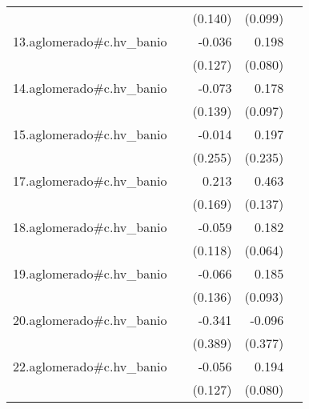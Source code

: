 {\begin{longtable}{l*{4}{D{.}{.}{-1}}}
            &                     &     (0.140)         &     (0.099)         &                     \\
\addlinespace
13.aglomerado#c.hv\_banio&                     &      -0.036         &       0.198\sym{*}  &                     \\
            &                     &     (0.127)         &     (0.080)         &                     \\
\addlinespace
14.aglomerado#c.hv\_banio&                     &      -0.073         &       0.178         &                     \\
            &                     &     (0.139)         &     (0.097)         &                     \\
\addlinespace
15.aglomerado#c.hv\_banio&                     &      -0.014         &       0.197         &                     \\
            &                     &     (0.255)         &     (0.235)         &                     \\
\addlinespace
17.aglomerado#c.hv\_banio&                     &       0.213         &       0.463\sym{***}&                     \\
            &                     &     (0.169)         &     (0.137)         &                     \\
\addlinespace
18.aglomerado#c.hv\_banio&                     &      -0.059         &       0.182\sym{**} &                     \\
            &                     &     (0.118)         &     (0.064)         &                     \\
\addlinespace
19.aglomerado#c.hv\_banio&                     &      -0.066         &       0.185\sym{*}  &                     \\
            &                     &     (0.136)         &     (0.093)         &                     \\
\addlinespace
20.aglomerado#c.hv\_banio&                     &      -0.341         &      -0.096         &                     \\
            &                     &     (0.389)         &     (0.377)         &                     \\
\addlinespace
22.aglomerado#c.hv\_banio&                     &      -0.056         &       0.194\sym{*}  &                     \\
            &                     &     (0.127)         &     (0.080)         &                     \\

\end{longtable}}
